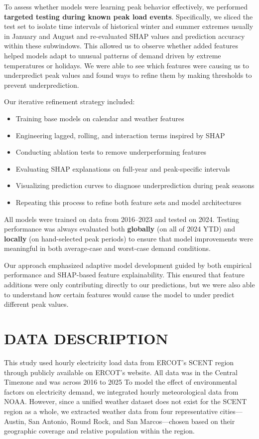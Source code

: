 \documentclass[final,numbered]{ifacconf}
\begin{document}
To assess whether models were learning peak behavior effectively, we performed \textbf{targeted testing during known peak load events}. Specifically, we sliced the test set to isolate time intervals of historical winter and summer extremes usually in January and August and re-evaluated SHAP values and prediction accuracy within these subwindows. This allowed us to observe whether added features helped models adapt to unusual patterns of demand driven by extreme temperatures or holidays. We were able to see which features were causing us to underpredict peak values and found ways to refine them by making thresholds to prevent underprediction.

Our iterative refinement strategy included:
\begin{itemize}
    \item Training base models on  calendar and weather features
    \item Engineering lagged, rolling, and interaction terms inspired by SHAP
    \item Conducting ablation tests to remove underperforming features
    \item Evaluating SHAP explanations on full-year and peak-specific intervals
    \item Visualizing prediction curves to diagnose underprediction during peak seasons
    \item Repeating this process to refine both feature sets and model architectures
\end{itemize}

All models were trained on data from 2016--2023 and tested on 2024. Testing performance was always evaluated both \textbf{globally} (on all of 2024 YTD) and \textbf{locally} (on hand-selected peak periods) to ensure that model improvements were meaningful in both average-case and worst-case demand conditions.

 Our approach emphasized adaptive model development guided by both empirical performance and SHAP-based feature explainability. This ensured that feature additions were only contributing directly to our predictions, but we were also able to understand how certain features would cause the model to under predict different peak values.

\section{DATA DESCRIPTION}

This study used hourly electricity load data from ERCOT’s SCENT region through publicly available on ERCOT's website. All data was in the Central Timezone and was across 2016 to 2025 To model the effect of environmental factors on electricity demand, we integrated hourly meteorological data from NOAA. However, since a unified weather dataset does not exist for the SCENT region as a whole, we extracted weather data from four representative cities—Austin, San Antonio, Round Rock, and San Marcos—chosen based on their geographic coverage and relative population within the region.
\end{document}
